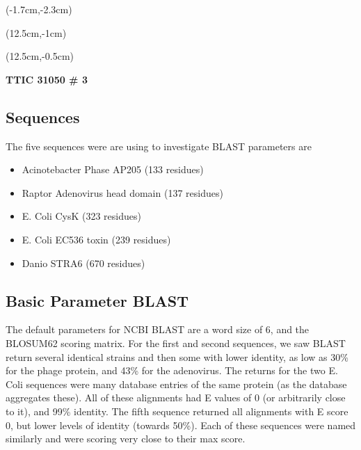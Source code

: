 \documentclass[12pt, oneside]{article}
\begin{document}

\begin{textblock*}{4cm}(-1.7cm,-2.3cm)
\end{textblock*}

\begin{textblock*}{8cm}(12.5cm,-1cm)
\end{textblock*}
\begin{textblock*}{3cm}(12.5cm,-0.5cm)
\end{textblock*}

\vspace{1cm}

\begin{center}
\textbf{\Large TTIC 31050 \# 3}
\end{center}

\subsection*{Sequences}
The five sequences were are using to investigate BLAST parameters are 
\begin{itemize}
\item Acinotebacter Phase AP205 (133 residues)
\item Raptor Adenovirus head domain (137 residues)
\item E. Coli CysK (323 residues)
\item E. Coli EC536 toxin (239 residues)
\item Danio STRA6 (670 residues)
\end{itemize}

\subsection*{Basic Parameter BLAST}
The default parameters for NCBI BLAST are a word size of 6, and the BLOSUM62 scoring matrix. For the first and second sequences, we saw BLAST return several identical strains and then some with lower identity, as low as 30\% for the phage protein, and 43\% for the adenovirus. The returns for the two E. Coli sequences were many database entries of the same protein (as the database aggregates these). All of these alignments had E values of 0 (or arbitrarily close to it), and 99\% identity. The fifth sequence returned all alignments with E score 0, but lower levels of identity (towards 50\%). Each of these sequences were named similarly and were scoring very close to their max score.
\end{document}
